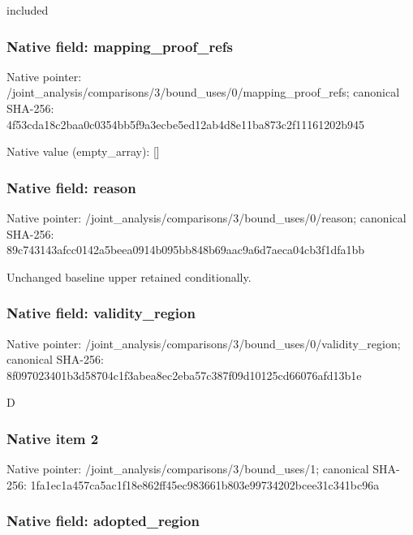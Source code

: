 \documentclass[10pt,a4paper]{article}
\begin{document}
included


\subsubsection{Native field: mapping\_proof\_refs}


Native pointer: /joint\_analysis/comparis\allowbreak{}ons/3/bound\_uses/0/mappi\allowbreak{}ng\_proof\_refs; canonical SHA-256: 4f53cda18c2baa0c0354bb5f\allowbreak{}9a3ecbe5ed12ab4d8e11ba87\allowbreak{}3c2f11161202b945



Native value (empty\_array): []



\subsubsection{Native field: reason}


Native pointer: /joint\_analysis/comparis\allowbreak{}ons/3/bound\_uses/0/reaso\allowbreak{}n; canonical SHA-256: 89c743143afcc0142a5beea0\allowbreak{}914b095bb848b69aac9a6d7a\allowbreak{}eca04cb3f1dfa1bb


Unchanged baseline upper retained conditionally.


\subsubsection{Native field: validity\_region}


Native pointer: /joint\_analysis/comparis\allowbreak{}ons/3/bound\_uses/0/valid\allowbreak{}ity\_region; canonical SHA-256: 8f097023401b3d58704c1f3a\allowbreak{}bea8ec2eba57c387f09d1012\allowbreak{}5cd66076afd13b1e


D


\subsubsection{Native item 2}


Native pointer: /joint\_analysis/comparis\allowbreak{}ons/3/bound\_uses/1; canonical SHA-256: 1fa1ec1a457ca5ac1f18e862\allowbreak{}ff45ec983661b803e9973420\allowbreak{}2bcee31c341bc96a



\subsubsection{Native field: adopted\_region}
\end{document}
